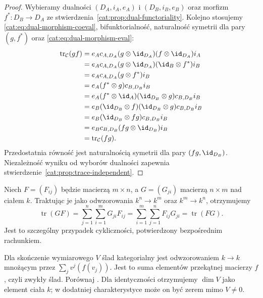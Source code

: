 \begin{proof}
Wybieramy dualności $(D_A,i_A,e_A)$ i $(D_B,i_B,e_B)$ oraz morfizm $f^*:D_B\to D_A$ ze stwierdzenia~\ref{cat:prop:dual-functoriality}. Kolejno stosujemy \eqref{cat:eq:dual-morphism-coeval}, bifunktorialność, naturalność symetrii dla pary $(g,f^*)$ oraz \eqref{cat:eq:dual-morphism-eval}:
\[
\begin{aligned}
\operatorname{tr}_{\mathcal C}(gf)
&=e_Ac_{A,D_A}(g\otimes\id_{D_A})(f\otimes\id_{D_A})i_A\\
&=e_Ac_{A,D_A}(g\otimes\id_{D_A})(\id_B\otimes f^*)i_B\\
&=e_Ac_{A,D_A}(g\otimes f^*)i_B\\
&=e_A(f^*\otimes g)c_{B,D_B}i_B\\
&=e_A(f^*\otimes\id_A)(\id_{D_B}\otimes g)c_{B,D_B}i_B\\
&=e_B(\id_{D_B}\otimes f)(\id_{D_B}\otimes g)c_{B,D_B}i_B\\
&=e_B(\id_{D_B}\otimes fg)c_{B,D_B}i_B\\
&=e_Bc_{B,D_B}(fg\otimes\id_{D_B})i_B\\
&=\operatorname{tr}_{\mathcal C}(fg).
\end{aligned}
\]
Przedostatnia równość jest naturalnością symetrii dla pary $(fg,\id_{D_B})$. Niezależność wyniku od wyborów dualności zapewnia stwierdzenie~\ref{cat:prop:trace-independent}.
\end{proof}
\begin{przyklad}\label{cat:ex:trace-rectangular}
Niech $F=(F_{ij})$ będzie macierzą $m\times n$, a $G=(G_{ji})$ macierzą $n\times m$ nad ciałem $k$. Traktując je jako odwzorowania $k^n\to k^m$ oraz $k^m\to k^n$, otrzymujemy
\[
\operatorname{tr}(GF)=\sum_{j=1}^n\sum_{i=1}^m G_{ji}F_{ij}
=\sum_{i=1}^m\sum_{j=1}^n F_{ij}G_{ji}=\operatorname{tr}(FG).
\]
Jest to szczególny przypadek cykliczności, potwierdzony bezpośrednim rachunkiem.
\end{przyklad}

\begin{przyklad}\label{cat:ex:trace-linear}
Dla skończenie wymiarowego $V$ ślad kategorialny jest odwzorowaniem $k\to k$ mnożącym przez $\sum_jv^j(f(v_j))$. Jest to suma elementów przekątnej macierzy $f$, czyli zwykły ślad. Porównaj . Dla identyczności otrzymujemy $\dim V$ jako element ciała $k$; w dodatniej charakterystyce może on być zerem mimo $V\neq0$.
\end{przyklad}
